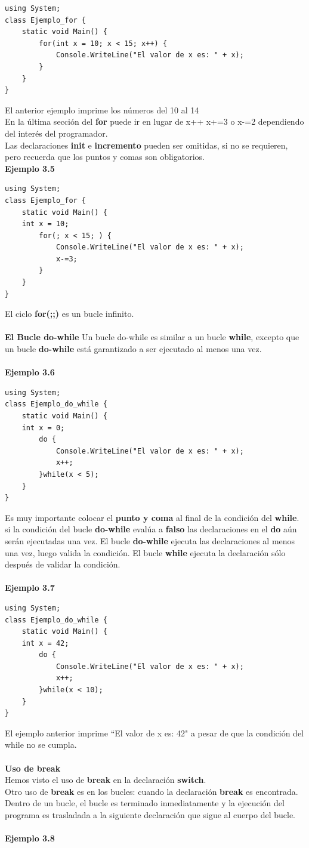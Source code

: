 \documentclass[12pt,a4paper]{report}
\begin{document}
\begin{lstlisting}
using System;
class Ejemplo_for {
	static void Main() {
		for(int x = 10; x < 15; x++) {
			Console.WriteLine("El valor de x es: " + x);		
		}
	}
}
\end{lstlisting}El anterior ejemplo imprime los números del 10 al 14\\En la última sección del \textbf{for} puede ir en lugar de x++ x+=3 o x-=2 dependiendo del interés del programador.\\Las declaraciones \textbf{init} e \textbf{incremento} pueden ser omitidas, si no se requieren, pero recuerda que los puntos y comas son obligatorios.\\\textbf{Ejemplo 3.5}\begin{lstlisting}
using System;
class Ejemplo_for {
	static void Main() {
	int x = 10;
		for(; x < 15; ) {
			Console.WriteLine("El valor de x es: " + x);
			x-=3;		
		}
	}
}
\end{lstlisting}El ciclo \textbf{for(;;){}} es un bucle infinito.\\\\
\textbf{El Bucle do-while}
Un bucle do-while es similar a un bucle \textbf{while}, excepto que un bucle \textbf{do-while} está garantizado a ser ejecutado al menos una vez.\\\\\textbf{Ejemplo 3.6}
\begin{lstlisting}
using System;
class Ejemplo_do_while {
	static void Main() {
	int x = 0;
		do {
			Console.WriteLine("El valor de x es: " + x);
			x++;		
		}while(x < 5);
	}
}
\end{lstlisting}Es muy importante colocar el \textbf{punto y coma} al final de la condición del \textbf{while}. si la condición del bucle \textbf{do-while} evalúa a \textbf{falso} las declaraciones en el \textbf{do} aún serán ejecutadas una vez. El bucle \textbf{do-while} ejecuta las declaraciones al menos una vez, luego valida la condición. El bucle \textbf{while} ejecuta la declaración sólo después de validar la condición.\\\\
\textbf{Ejemplo 3.7}
\begin{lstlisting}
using System;
class Ejemplo_do_while {
	static void Main() {
	int x = 42;
		do {
			Console.WriteLine("El valor de x es: " + x);
			x++;		
		}while(x < 10);
	}
}
\end{lstlisting}El ejemplo anterior imprime ``El valor de x es: 42" a pesar de que la condición del while no se cumpla.\\\\\textbf{Uso de break}\\Hemos visto el uso de \textbf{break} en la declaración \textbf{switch}.\\Otro uso de \textbf{break} es en los bucles: cuando la declaración \textbf{break} es encontrada. Dentro de un bucle, el bucle es terminado inmediatamente y la ejecución del programa es trasladada a la siguiente declaración que sigue al cuerpo del bucle.\\\\\textbf{Ejemplo 3.8}
\end{document}
